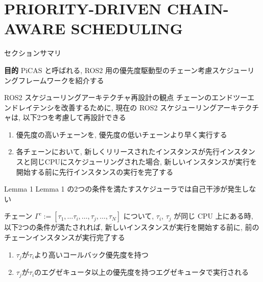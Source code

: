 
\section{PRIORITY-DRIVEN CHAIN-AWARE SCHEDULING}
\label{sec: priority-driven chain-aware scheduling}

\begin{frame}{セクションサマリ}
    \begin{itembox}[l]{\textbf{目的}}
        PiCAS と呼ばれる, ROS2 用の優先度駆動型のチェーン考慮スケジューリングフレームワークを紹介する
    \end{itembox}
\end{frame}

\begin{frame}{ROS2 スケジューリングアーキテクチャ再設計の観点}
    チェーンのエンドツーエンドレイテンシを改善するために, 現在の ROS2 スケジューリングアーキテクチャは, 以下2つを考慮して再設計できる
    \begin{enumerate}
        \item 優先度の高いチェーンを, 優先度の低いチェーンより早く実行する
        \item 各チェーンにおいて, 新しくリリースされたインスタンスが先行インスタンスと同じCPUにスケジューリングされた場合, 新しいインスタンスが実行を開始する前に先行インスタンスの実行を完了する
    \end{enumerate}
\end{frame}

\begin{frame}[label=lemma1]{Lemma 1}
    Lemma 1 の2つの条件を満たすスケジューラでは自己干渉が発生しない
    \begin{lemma}[]
        チェーン $\Gamma^{c}:=\left[\tau_{1}, \ldots \tau_{i}, \ldots, \tau_{j}, \ldots, \tau_{N}\right]$ について, $\tau_{i}$, $\tau_{j}$ が同じ CPU 上にある時, 以下2つの条件が満たされれば, 新しいインスタンスが実行を開始する前に, 前のチェーンインスタンスが実行完了する
        \begin{enumerate}
            \item $\tau_{j}$が$\tau_{i}$より高いコールバック優先度を持つ
            \item $\tau_{j}$が$\tau_{i}$のエグゼキュータ以上の優先度を持つエグゼキュータで実行される
        \end{enumerate}
    \end{lemma}
\end{frame}

